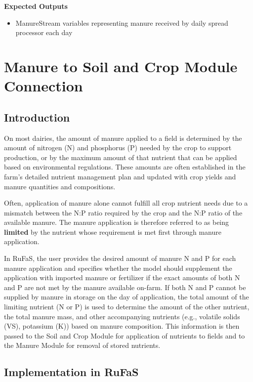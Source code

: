 \begin{refsection}
\textbf{Expected Outputs}
\vspace{ 0.25cm}

\begin{itemize}
    \item ManureStream variables representing manure received by daily spread processor each day

\end{itemize}
\vspace{0.2cm}

\newpage
\section{Manure to Soil and Crop Module Connection}
\subsection{Introduction}

On most dairies, the amount of manure applied to a field is determined by the amount of nitrogen (N) and phosphorus (P) needed by the crop to support production, or by the maximum amount of that nutrient that can be applied based on environmental regulations. These amounts are often established in the farm's detailed nutrient management plan and updated with crop yields and manure quantities and compositions.

Often, application of manure alone cannot fulfill all crop nutrient needs due to a mismatch between the N:P ratio required by the crop and the N:P ratio of the available manure. The manure application is therefore referred to as being \textbf{limited} by the nutrient whose requirement is met first through manure application.

In RuFaS, the user provides the desired amount of manure N and P for each manure application and specifies whether the model should supplement the application with imported manure or fertilizer if the exact amounts of both N and P are not met by the manure available on-farm. If both N and P cannot be supplied by manure in storage on the day of application, the total amount of the limiting nutrient (N or P) is used to determine the amount of the other nutrient, the total manure mass, and other accompanying nutrients (e.g., volatile solids (VS), potassium (K)) based on manure composition. This information is then passed to the Soil and Crop Module for application of nutrients to fields and to the Manure Module for removal of stored nutrients.

\subsection{Implementation in RuFaS}


\end{refsection}
